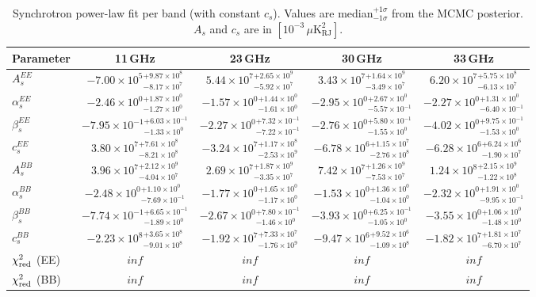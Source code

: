 \begin{table}[htbp]
\centering
\caption{Synchrotron power-law fit per band (with constant $c_s$). Values are median$^{+1\sigma}_{-1\sigma}$ from the MCMC posterior. $A_s$ and $c_s$ are in $[10^{-3}\,\mu\mathrm{K}^2_\mathrm{RJ}]$.}
\label{tab:sync_single_band_withc}
\begin{tabular}{lcccc}
\toprule
Parameter & 11\,GHz & 23\,GHz & 30\,GHz & 33\,GHz \\
\midrule
$A_s^{EE}$ & $-7.00\times10^{5}{}^{+9.87\times10^{8}}_{-8.17\times10^{7}}$ & $5.44\times10^{7}{}^{+2.65\times10^{9}}_{-5.92\times10^{7}}$ & $3.43\times10^{7}{}^{+1.64\times10^{9}}_{-3.49\times10^{7}}$ & $6.20\times10^{7}{}^{+5.75\times10^{8}}_{-6.13\times10^{7}}$ \\
$\alpha_s^{EE}$ & $-2.46\times10^{0}{}^{+1.87\times10^{0}}_{-1.27\times10^{0}}$ & $-1.57\times10^{0}{}^{+1.44\times10^{0}}_{-1.61\times10^{0}}$ & $-2.95\times10^{0}{}^{+2.67\times10^{0}}_{-5.57\times10^{-1}}$ & $-2.27\times10^{0}{}^{+1.31\times10^{0}}_{-6.40\times10^{-1}}$ \\
$\beta_s^{EE}$ & $-7.95\times10^{-1}{}^{+6.03\times10^{-1}}_{-1.33\times10^{0}}$ & $-2.27\times10^{0}{}^{+7.32\times10^{-1}}_{-7.22\times10^{-1}}$ & $-2.76\times10^{0}{}^{+5.80\times10^{-1}}_{-1.55\times10^{0}}$ & $-4.02\times10^{0}{}^{+9.75\times10^{-1}}_{-1.53\times10^{0}}$ \\
$c_s^{EE}$ & $3.80\times10^{7}{}^{+7.61\times10^{8}}_{-8.21\times10^{8}}$ & $-3.24\times10^{7}{}^{+1.17\times10^{8}}_{-2.53\times10^{9}}$ & $-6.78\times10^{6}{}^{+1.15\times10^{7}}_{-2.76\times10^{8}}$ & $-6.28\times10^{6}{}^{+6.24\times10^{6}}_{-1.90\times10^{7}}$ \\
\midrule
$A_s^{BB}$ & $3.96\times10^{7}{}^{+2.12\times10^{9}}_{-4.04\times10^{7}}$ & $2.69\times10^{7}{}^{+1.87\times10^{9}}_{-3.35\times10^{7}}$ & $7.42\times10^{7}{}^{+1.26\times10^{9}}_{-7.53\times10^{7}}$ & $1.24\times10^{8}{}^{+2.15\times10^{9}}_{-1.22\times10^{8}}$ \\
$\alpha_s^{BB}$ & $-2.48\times10^{0}{}^{+1.10\times10^{0}}_{-7.69\times10^{-1}}$ & $-1.77\times10^{0}{}^{+1.65\times10^{0}}_{-1.17\times10^{0}}$ & $-1.53\times10^{0}{}^{+1.36\times10^{0}}_{-1.04\times10^{0}}$ & $-2.32\times10^{0}{}^{+1.91\times10^{0}}_{-9.95\times10^{-1}}$ \\
$\beta_s^{BB}$ & $-7.74\times10^{-1}{}^{+6.65\times10^{-1}}_{-1.89\times10^{0}}$ & $-2.67\times10^{0}{}^{+7.80\times10^{-1}}_{-1.46\times10^{0}}$ & $-3.93\times10^{0}{}^{+6.25\times10^{-1}}_{-1.05\times10^{0}}$ & $-3.55\times10^{0}{}^{+1.06\times10^{0}}_{-1.48\times10^{0}}$ \\
$c_s^{BB}$ & $-2.23\times10^{8}{}^{+3.65\times10^{8}}_{-9.01\times10^{8}}$ & $-1.92\times10^{7}{}^{+7.33\times10^{7}}_{-1.76\times10^{9}}$ & $-9.47\times10^{6}{}^{+9.52\times10^{6}}_{-1.09\times10^{8}}$ & $-1.82\times10^{7}{}^{+1.81\times10^{7}}_{-6.70\times10^{7}}$ \\
\midrule
$\chi^2_{\rm red}$ (EE) & $inf$ & $inf$ & $inf$ & $inf$ \\
$\chi^2_{\rm red}$ (BB) & $inf$ & $inf$ & $inf$ & $inf$ \\
\bottomrule
\end{tabular}
\end{table}
